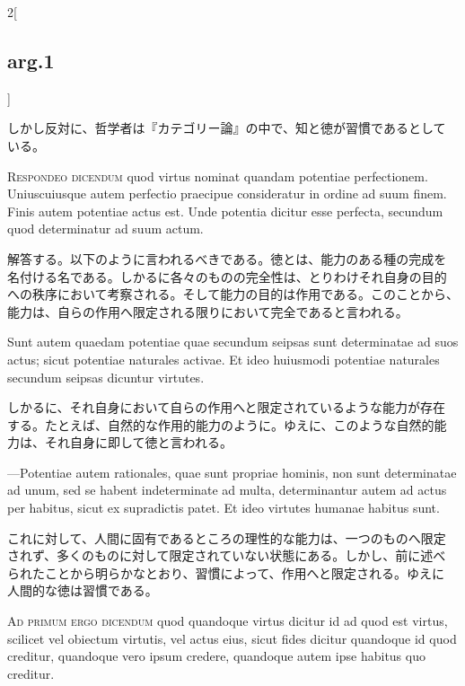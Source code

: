 \documentclass[paper=a4paper,fontsize=10pt,jafontsize=9pt,titlepage]{jlreq}
\begin{document}
\begin{paracol}{2}[\subsection{arg.1}]
\switchcolumn

しかし反対に、哲学者は『カテゴリー論』の中で、知と徳が習慣であるとして
いる。


{\scshape Respondeo dicendum} quod virtus nominat quandam potentiae
perfectionem. Uniuscuiusque autem perfectio praecipue consideratur in
ordine ad suum finem. Finis autem potentiae actus est. Unde potentia
dicitur esse perfecta, secundum quod determinatur ad suum actum.

\switchcolumn

解答する。以下のように言われるべきである。徳とは、能力のある種の完成を
名付ける名である。しかるに各々のものの完全性は、とりわけそれ自身の目的
への秩序において考察される。そして能力の目的は作用である。このことから、
能力は、自らの作用へ限定される限りにおいて完全であると言われる。

\switchcolumn*

Sunt autem quaedam potentiae quae secundum seipsas sunt determinatae
ad suos actus; sicut potentiae naturales activae. Et ideo huiusmodi
potentiae naturales secundum seipsas dicuntur virtutes.

\switchcolumn

しかるに、それ自身において自らの作用へと限定されているような能力が存在
する。たとえば、自然的な作用的能力のように。ゆえに、このような自然的能
力は、それ自身に即して徳と言われる。

\switchcolumn*

---Potentiae autem rationales, quae sunt propriae hominis, non sunt
   determinatae ad unum, sed se habent indeterminate ad multa,
   determinantur autem ad actus per habitus, sicut ex supradictis
   patet. Et ideo virtutes humanae habitus sunt.

\switchcolumn

これに対して、人間に固有であるところの理性的な能力は、一つのものへ限定
されず、多くのものに対して限定されていない状態にある。しかし、前に述べ
られたことから明らかなとおり、習慣によって、作用へと限定される。ゆえに
人間的な徳は習慣である。

\switchcolumn*[\subsection{ad.1}]

{\scshape Ad primum ergo dicendum} quod quandoque virtus dicitur id ad
quod est virtus, scilicet vel obiectum virtutis, vel actus eius, sicut
fides dicitur quandoque id quod creditur, quandoque vero ipsum
credere, quandoque autem ipse habitus quo creditur.


\end{paracol}
\end{document}
